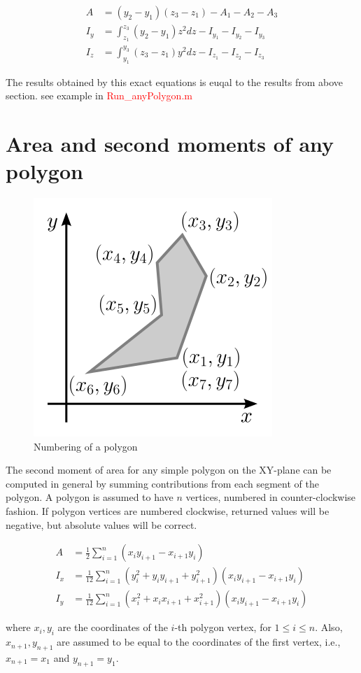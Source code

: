 \begin{align*}
A &= (y_2-y_1)(z_3-z_1)-A_1-A_2-A_3 \\
I_y &= \int_{z_1}^{z_3}(y_2-y_1) z^2 dz - I_{y_1} - I_{y_2} - I_{y_3} \\
I_z &= \int_{y_1}^{y_3}(z_3-z_1) y^2 dz - I_{z_1} - I_{z_2} - I_{z_3}
\end{align*}

The results obtained by this exact equations is euqal to the results from above section. see example in \textcolor{red}{Run\_anyPolygon.m}

\section{Area and second moments of any polygon}
\begin{figure}[h!]
	\centering
	\includegraphics[width=0.4\linewidth]{Figures/Moment_of_area_of_a_polygon}
	\caption{Numbering of a polygon}
	\label{fig:numberingofapolygon}
\end{figure}

The second moment of area for any simple polygon on the XY-plane can be computed in general by summing contributions from each segment of the polygon. A polygon is assumed to have $ n $ vertices, numbered in counter-clockwise fashion. If polygon vertices are numbered clockwise, returned values will be negative, but absolute values will be correct.

\begin{align*}
	A &= \frac{1}{2} \sum_{i=1}^{n} (x_i y_{i+1} - x_{i+1} y_i) \\
	I_{x} &= {\frac {1}{12}}\sum_{i=1}^{n}(y_{i}^{2}+y_{i}y_{i+1}+y_{i+1}^{2})(x_{i}y_{i+1}-x_{i+1}y_{i}) \\
	I_{y} &= {\frac {1}{12}}\sum _{i=1}^{n}(x_{i}^{2}+x_{i}x_{i+1}+x_{i+1}^{2})(x_{i}y_{i+1}-x_{i+1}y_{i})
\end{align*}

where  $ x_{i},y_{i} $ are the coordinates of the $ i $-th polygon vertex, for $ 1\leq i\leq n $. Also, $ x_{n+1},y_{n+1} $ are assumed to be equal to the coordinates of the first vertex, i.e., $ x_{n+1}=x_{1} $ and $ y_{n+1}=y_{1} $.

